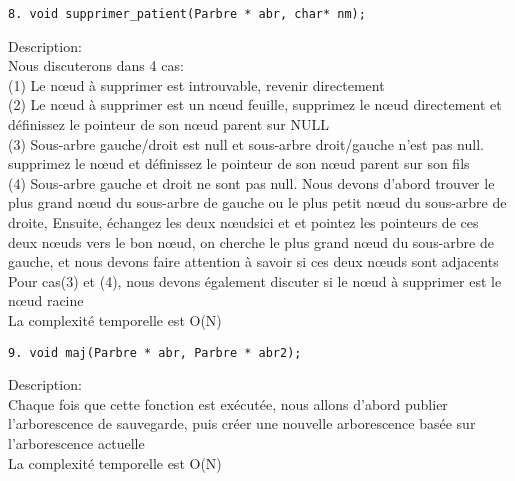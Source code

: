 \documentclass[11pt]{article}
\begin{document}
\begin{verbatim}
8. void supprimer_patient(Parbre * abr, char* nm);
\end{verbatim}
Description:\\
Nous discuterons dans 4 cas:\\
(1) Le nœud à supprimer est introuvable, revenir directement\\
(2) Le nœud à supprimer est un nœud feuille, supprimez le nœud directement et définissez le pointeur de son nœud parent sur NULL\\
(3) Sous-arbre gauche/droit est null et sous-arbre droit/gauche n'est pas null. supprimez le nœud et définissez le pointeur de son nœud parent sur son fils \\
(4) Sous-arbre gauche et droit ne sont pas null. Nous devons d'abord trouver le plus grand nœud du sous-arbre de gauche ou le plus petit nœud du sous-arbre de droite, Ensuite, échangez les deux nœudsici et et pointez les pointeurs de ces deux nœuds vers le bon nœud, on cherche le plus grand nœud du sous-arbre de gauche, et nous devons faire attention à savoir si ces deux nœuds sont adjacents\\ 
Pour cas(3) et (4), nous devons également discuter si le nœud à supprimer est le nœud racine\\
La complexité temporelle est O(N)
\begin{verbatim}
9. void maj(Parbre * abr, Parbre * abr2);
\end{verbatim}
Description:\\
Chaque fois que cette fonction est exécutée, nous allons d'abord publier l'arborescence de sauvegarde, puis créer une nouvelle arborescence basée sur l'arborescence actuelle\\
La complexité temporelle est O(N)
\end{document}
